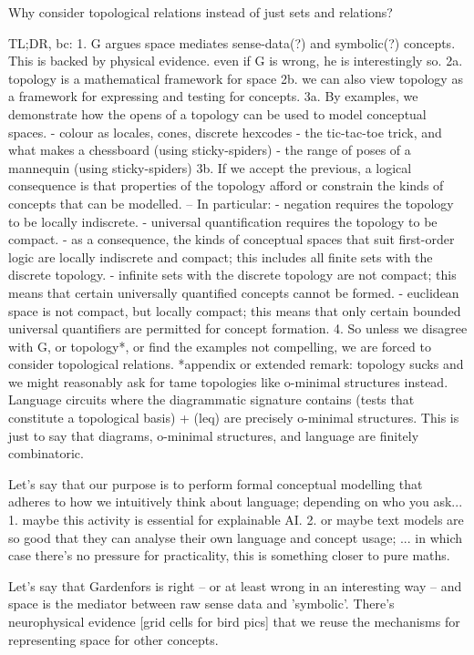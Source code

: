 Why consider topological relations instead of just sets and relations?

TL;DR, bc:
1. G argues space mediates sense-data(?) and symbolic(?) concepts.
This is backed by physical evidence. even if G is wrong, he is interestingly so.
2a. topology is a mathematical framework for space
2b. we can also view topology as a framework for expressing and testing for concepts.
3a. By examples, we demonstrate how the opens of a topology can be used to model conceptual spaces.
- colour as locales, cones, discrete hexcodes
- the tic-tac-toe trick, and what makes a chessboard (using sticky-spiders)
- the range of poses of a mannequin (using sticky-spiders)
3b. If we accept the previous, a logical consequence is that properties of the topology afford or constrain the kinds of concepts that can be modelled.
-- In particular:
- negation requires the topology to be locally indiscrete.
- universal quantification requires the topology to be compact.
- as a consequence, the kinds of conceptual spaces that suit first-order logic are locally indiscrete and compact; this includes all finite sets with the discrete topology.
- infinite sets with the discrete topology are not compact; this means that certain universally quantified concepts cannot be formed.
- euclidean space is not compact, but locally compact; this means that only certain bounded universal quantifiers are permitted for concept formation.
4. So unless we disagree with G, or topology*, or find the examples not compelling, we are forced to consider topological relations.
*appendix or extended remark: topology sucks and we might reasonably ask for tame topologies like o-minimal structures instead. Language circuits where the diagrammatic signature contains (tests that constitute a topological basis) + (leq) are precisely o-minimal structures. This is just to say that diagrams, o-minimal structures, and language are finitely combinatoric.

Let's say that our purpose is to perform formal conceptual modelling that adheres to how we intuitively think about language;
depending on who you ask...
1. maybe this activity is essential for explainable AI.
2. or maybe text models are so good that they can analyse their own language and concept usage;
... in which case there's no pressure for practicality, this is something closer to pure maths.

Let's say that Gardenfors is right -- or at least wrong in an interesting way -- and space is the mediator between raw sense data and 'symbolic'. There's neurophysical evidence [grid cells for bird pics] that we reuse the mechanisms for representing space for other concepts.

